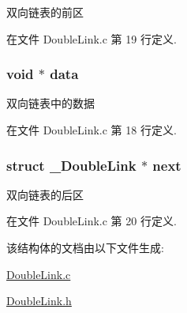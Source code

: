 双向链表的前区 



在文件 Double\-Link.\-c 第 19 行定义.

\hypertarget{struct___double_link_ac5c5967f62e5c3601479be651a8ed76c}{
\subsubsection[{data}]{\setlength{\rightskip}{0pt plus 5cm}void $\ast$ data}}\label{struct___double_link_ac5c5967f62e5c3601479be651a8ed76c}


双向链表中的数据 



在文件 Double\-Link.\-c 第 18 行定义.

\hypertarget{struct___double_link_a639ac2cfb816181dcb50312819536299}{
\subsubsection[{next}]{\setlength{\rightskip}{0pt plus 5cm}struct {\bf \-\_\-\-Double\-Link} $\ast$ next}}\label{struct___double_link_a639ac2cfb816181dcb50312819536299}


双向链表的后区 



在文件 Double\-Link.\-c 第 20 行定义.



该结构体的文档由以下文件生成\-:\begin{DoxyCompactItemize}
\item 
\hyperlink{_double_link_8c}{Double\-Link.\-c}\item 
\hyperlink{_double_link_8h}{Double\-Link.\-h}\end{DoxyCompactItemize}

